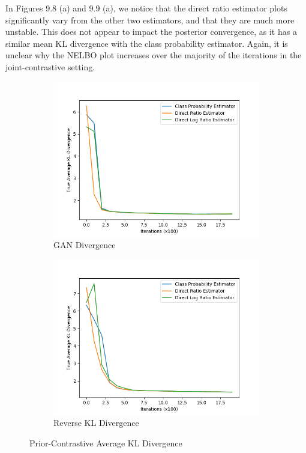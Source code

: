 \documentclass[honours,12pt]{unswthesis}
\numberwithin{equation}{section}
\theoremstyle{definition}
\begin{document}
In Figures 9.8 (a) and 9.9 (a), we notice that the direct ratio estimator plots significantly vary from the other two estimators, and that they are much more unstable. This does not appear to impact the posterior convergence, as it has a similar mean KL divergence with the class probability estimator. Again, it is unclear why the NELBO plot increases over the majority of the iterations in the joint-contrastive setting.
\newpage
\begin{figure}
\begin{subfigure}{0.49\textwidth}
\includegraphics[width=\linewidth]{part2truklmins/PCADVvsPCADVexpvsPCADVgudlog.png}
\caption{GAN Divergence}
\end{subfigure}
\begin{subfigure}{0.49\textwidth}
\includegraphics[width=\linewidth]{part2truklmins/PCKLDvsPCKLexpvsPCKLgudlog.png}
\caption{Reverse KL Divergence}
\end{subfigure}
\caption{Prior-Contrastive Average KL Divergence}
\end{figure}
\end{document}
